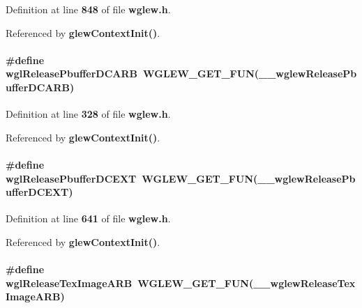 Definition at line {\bf 848} of file {\bf wglew.\+h}.



Referenced by {\bf glew\+Context\+Init()}.

\paragraph[{wgl\+Release\+Pbuffer\+D\+C\+A\+RB}]{\setlength{\rightskip}{0pt plus 5cm}\#define wgl\+Release\+Pbuffer\+D\+C\+A\+RB~{\bf W\+G\+L\+E\+W\+\_\+\+G\+E\+T\+\_\+\+F\+UN}({\bf \+\_\+\+\_\+wglew\+Release\+Pbuffer\+D\+C\+A\+RB})}\label{wglew_8h_a5e97d07092dd3dc6e0a0c5739d865861}


Definition at line {\bf 328} of file {\bf wglew.\+h}.



Referenced by {\bf glew\+Context\+Init()}.

\paragraph[{wgl\+Release\+Pbuffer\+D\+C\+E\+XT}]{\setlength{\rightskip}{0pt plus 5cm}\#define wgl\+Release\+Pbuffer\+D\+C\+E\+XT~{\bf W\+G\+L\+E\+W\+\_\+\+G\+E\+T\+\_\+\+F\+UN}({\bf \+\_\+\+\_\+wglew\+Release\+Pbuffer\+D\+C\+E\+XT})}\label{wglew_8h_ac97660418ce5bf4ce023e07799ff8e1f}


Definition at line {\bf 641} of file {\bf wglew.\+h}.



Referenced by {\bf glew\+Context\+Init()}.

\paragraph[{wgl\+Release\+Tex\+Image\+A\+RB}]{\setlength{\rightskip}{0pt plus 5cm}\#define wgl\+Release\+Tex\+Image\+A\+RB~{\bf W\+G\+L\+E\+W\+\_\+\+G\+E\+T\+\_\+\+F\+UN}({\bf \+\_\+\+\_\+wglew\+Release\+Tex\+Image\+A\+RB})}\label{wglew_8h_a0f08587fe69e50d1c37a2684574ef887}


